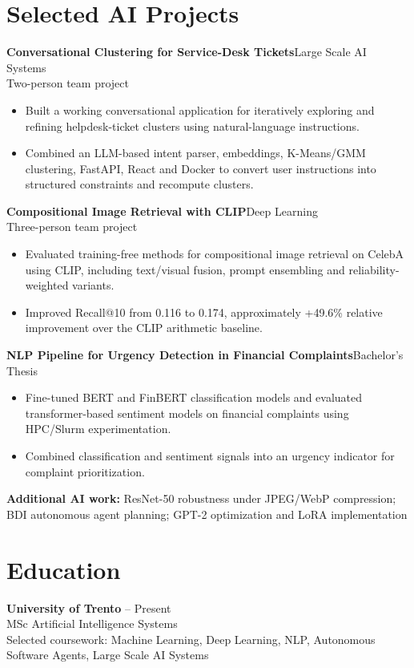 \documentclass[10pt,a4paper]{article}
\newcommand{\role}[2]{\textbf{#1}{\color{textgray}\space\textbar{}\space#2}}
\newcommand{\place}[1]{{\color{textgray}#1}}
\begin{document}
\section*{Selected AI Projects}
\role{Conversational Clustering for Service-Desk Tickets}{Large Scale AI Systems}\\
\place{Two-person team project}
\begin{itemize}
  \item Built a working conversational application for iteratively exploring and refining helpdesk-ticket clusters using natural-language instructions.
  \item Combined an LLM-based intent parser, embeddings, K-Means/GMM clustering, FastAPI, React and Docker to convert user instructions into structured constraints and recompute clusters.
\end{itemize}

\role{Compositional Image Retrieval with CLIP}{Deep Learning}\\
\place{Three-person team project}
\begin{itemize}
  \item Evaluated training-free methods for compositional image retrieval on CelebA using CLIP, including text/visual fusion, prompt ensembling and reliability-weighted variants.
  \item Improved Recall@10 from 0.116 to 0.174, approximately +49.6\% relative improvement over the CLIP arithmetic baseline.
\end{itemize}

\role{NLP Pipeline for Urgency Detection in Financial Complaints}{Bachelor's Thesis}
\begin{itemize}
  \item Fine-tuned BERT and FinBERT classification models and evaluated transformer-based sentiment models on financial complaints using HPC/Slurm experimentation.
  \item Combined classification and sentiment signals into an urgency indicator for complaint prioritization.
\end{itemize}

\textbf{Additional AI work:} ResNet-50 robustness under JPEG/WebP compression; BDI autonomous agent planning; GPT-2 optimization and LoRA implementation

\section*{Education}
\role{University of Trento}{2025 -- Present}\\
MSc Artificial Intelligence Systems\\
\place{Selected coursework: Machine Learning, Deep Learning, NLP, Autonomous Software Agents, Large Scale AI Systems}
\end{document}

